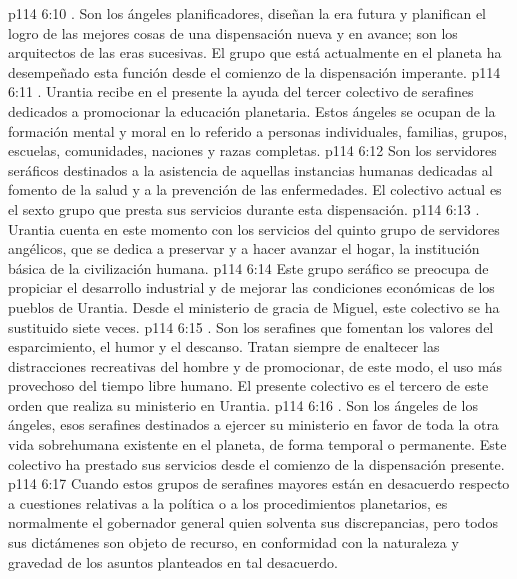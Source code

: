 \vs p114 6:10 . Son los ángeles planificadores, diseñan la era futura y planifican el logro de las mejores cosas de una dispensación nueva y en avance; son los arquitectos de las eras sucesivas. El grupo que está actualmente en el planeta ha desempeñado esta función desde el comienzo de la dispensación imperante.
\vs p114 6:11 . Urantia recibe en el presente la ayuda del tercer colectivo de serafines dedicados a promocionar la educación planetaria. Estos ángeles se ocupan de la formación mental y moral en lo referido a personas individuales, familias, grupos, escuelas, comunidades, naciones y razas completas.
\vs p114 6:12  Son los servidores seráficos destinados a la asistencia de aquellas instancias humanas dedicadas al fomento de la salud y a la prevención de las enfermedades. El colectivo actual es el sexto grupo que presta sus servicios durante esta dispensación.
\vs p114 6:13 . Urantia cuenta en este momento con los servicios del quinto grupo de servidores angélicos, que se dedica a preservar y a hacer avanzar el hogar, la institución básica de la civilización humana.
\vs p114 6:14  Este grupo seráfico se preocupa de propiciar el desarrollo industrial y de mejorar las condiciones económicas de los pueblos de Urantia. Desde el ministerio de gracia de Miguel, este colectivo se ha sustituido siete veces.
\vs p114 6:15 . Son los serafines que fomentan los valores del esparcimiento, el humor y el descanso. Tratan siempre de enaltecer las distracciones recreativas del hombre y de promocionar, de este modo, el uso más provechoso del tiempo libre humano. El presente colectivo es el tercero de este orden que realiza su ministerio en Urantia.
\vs p114 6:16 . Son los ángeles de los ángeles, esos serafines destinados a ejercer su ministerio en favor de toda la otra vida sobrehumana existente en el planeta, de forma temporal o permanente. Este colectivo ha prestado sus servicios desde el comienzo de la dispensación presente.
\vs p114 6:17 \pc Cuando estos grupos de serafines mayores están en desacuerdo respecto a cuestiones relativas a la política o a los procedimientos planetarios, es normalmente el gobernador general quien solventa sus discrepancias, pero todos sus dictámenes son objeto de recurso, en conformidad con la naturaleza y gravedad de los asuntos planteados en tal desacuerdo.
